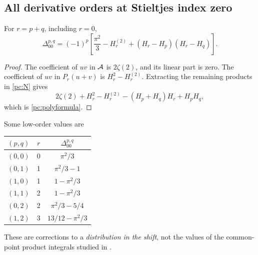 \subsection{All derivative orders at Stieltjes index zero}
\begin{corollary}\label{pc:polygamma}
For $r=p+q$, including $r=0$,
\begin{equation}\label{pc:polyformula}
 \boxed{\ \Delta_{00}^{p,q}=(-1)^p
 \left[\frac{\pi^2}{3}-H_r^{(2)}+(H_r-H_p)(H_r-H_q)\right].\ }
\end{equation}
\end{corollary}
\begin{proof}
The coefficient of $uv$ in $\mathcal A$ is $2\zeta(2)$, and its linear part is zero. The coefficient of $uv$ in $P_r(u+v)$ is $H_r^2-H_r^{(2)}$. Extracting the remaining products in \eqref{pc:N} gives
\[
 2\zeta(2)+H_r^2-H_r^{(2)}-(H_p+H_q)H_r+H_pH_q,
\]
which is \eqref{pc:polyformula}.
\end{proof}
Some low-order values are
\begin{center}
\begin{tabular}{@{}ccc@{}}
\toprule
$(p,q)$ & $r$ & $\Delta_{00}^{p,q}$\\
\midrule
$(0,0)$&0&$\pi^2/3$\\
$(0,1)$&1&$\pi^2/3-1$\\
$(1,0)$&1&$1-\pi^2/3$\\
$(1,1)$&2&$1-\pi^2/3$\\
$(0,2)$&2&$\pi^2/3-5/4$\\
$(1,2)$&3&$13/12-\pi^2/3$\\
\bottomrule
\end{tabular}
\end{center}
These are corrections to a \emph{distribution in the shift}, not the values of the common-point product integrals studied in \cite{pcc:reports}.

